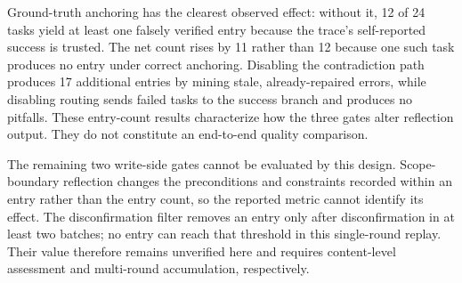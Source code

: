 Ground-truth anchoring has the clearest observed effect: without it, 12 of 24 tasks yield at least one falsely verified entry because the trace's self-reported success is trusted. The net count rises by 11 rather than 12 because one such task produces no entry under correct anchoring. Disabling the contradiction path produces 17 additional entries by mining stale, already-repaired errors, while disabling routing sends failed tasks to the success branch and produces no pitfalls. These entry-count results characterize how the three gates alter reflection output. They do not constitute an end-to-end quality comparison.

The remaining two write-side gates cannot be evaluated by this design. Scope-boundary reflection changes the preconditions and constraints recorded within an entry rather than the entry count, so the reported metric cannot identify its effect. The disconfirmation filter removes an entry only after disconfirmation in at least two batches; no entry can reach that threshold in this single-round replay. Their value therefore remains unverified here and requires content-level assessment and multi-round accumulation, respectively.

